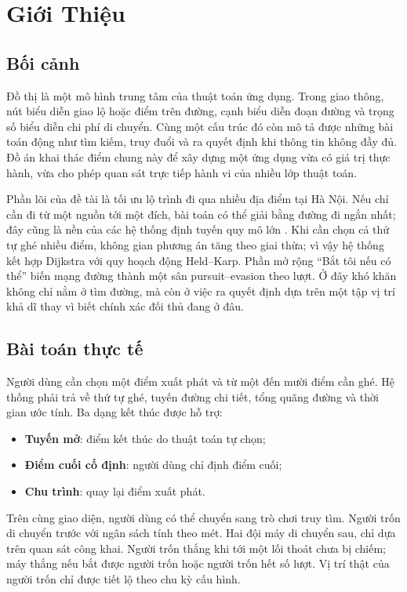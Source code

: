 \chapter{Giới Thiệu}

\section{Bối cảnh}

Đồ thị là một mô hình trung tâm của thuật toán ứng dụng. Trong giao thông, nút
biểu diễn giao lộ hoặc điểm trên đường, cạnh biểu diễn đoạn đường và trọng số
biểu diễn chi phí di chuyển. Cùng một cấu trúc đó còn mô tả được những bài toán
động như tìm kiếm, truy đuổi và ra quyết định khi thông tin không đầy đủ. Đồ án
khai thác điểm chung này để xây dựng một ứng dụng vừa có giá trị thực hành, vừa
cho phép quan sát trực tiếp hành vi của nhiều lớp thuật toán.

Phần lõi của đề tài là tối ưu lộ trình đi qua nhiều địa điểm tại Hà Nội. Nếu chỉ
cần đi từ một nguồn tới một đích, bài toán có thể giải bằng đường đi ngắn nhất;
đây cũng là nền của các hệ thống định tuyến quy mô lớn \cite{delling2009}.
Khi cần chọn cả thứ tự ghé nhiều điểm, không gian phương án tăng theo giai thừa;
vì vậy hệ thống kết hợp Dijkstra với quy hoạch động Held--Karp. Phần mở rộng
``Bắt tôi nếu có thể'' biến mạng đường thành một sân pursuit--evasion theo lượt.
Ở đây khó khăn không chỉ nằm ở tìm đường, mà còn ở việc ra quyết định dựa trên
một tập vị trí khả dĩ thay vì biết chính xác đối thủ đang ở đâu.

\section{Bài toán thực tế}

Người dùng cần chọn một điểm xuất phát và từ một đến mười điểm cần ghé. Hệ thống
phải trả về thứ tự ghé, tuyến đường chi tiết, tổng quãng đường và thời gian ước
tính. Ba dạng kết thúc được hỗ trợ:
\begin{itemize}
  \item \textbf{Tuyến mở}: điểm kết thúc do thuật toán tự chọn;
  \item \textbf{Điểm cuối cố định}: người dùng chỉ định điểm cuối;
  \item \textbf{Chu trình}: quay lại điểm xuất phát.
\end{itemize}

Trên cùng giao diện, người dùng có thể chuyển sang trò chơi truy tìm. Người trốn
di chuyển trước với ngân sách tính theo mét. Hai đội máy di chuyển sau, chỉ dựa
trên quan sát công khai. Người trốn thắng khi tới một lối thoát chưa bị chiếm;
máy thắng nếu bắt được người trốn hoặc người trốn hết số lượt. Vị trí thật của
người trốn chỉ được tiết lộ theo chu kỳ cấu hình.

